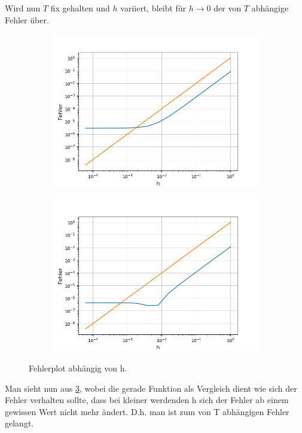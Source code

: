 \documentclass[12pt,a4paper]{scrartcl}
\numberwithin{equation}{section}
\numberwithin{myalgctr}{section}
\numberwithin{mytheoremctr}{subsection}
\numberwithin{mykorollarctr}{subsection}
\numberwithin{mylemmactr}{subsection}
\numberwithin{mybeispielctr}{subsection}
\begin{document}
	
	Wird nun $T$ fix gehalten und $h$ variiert, bleibt f\"ur $h\to 0$ der von $T$ abh\"angige Fehler \"uber. 
	
	\begin{figure}[H]
		\begin{subfigure}[t]{0.5\textwidth}
			\includegraphics[width=\linewidth]{FehlerplotTsinx.png}
			 \label{fig:fehlerplottsinx}
		\end{subfigure}
		\begin{subfigure}[t]{0.5\textwidth}
			\includegraphics[width=\linewidth]{FehlerplotTexp.png}
			 \label{fig:fehlerplottexp}
		\end{subfigure}
		\caption{Fehlerplot abhängig von h.}
		\label{fig:fehlerplott}
	\end{figure}
	Man sieht nun aus \cref{fig:fehlerplott}, wobei die gerade Funktion als Vergleich dient wie sich der Fehler verhalten sollte, dass bei kleiner werdenden h sich der Fehler ab einem gewissen Wert nicht mehr ändert. D.h. man ist zum von T abhängigen Fehler gelangt.   
	
\end{document}
